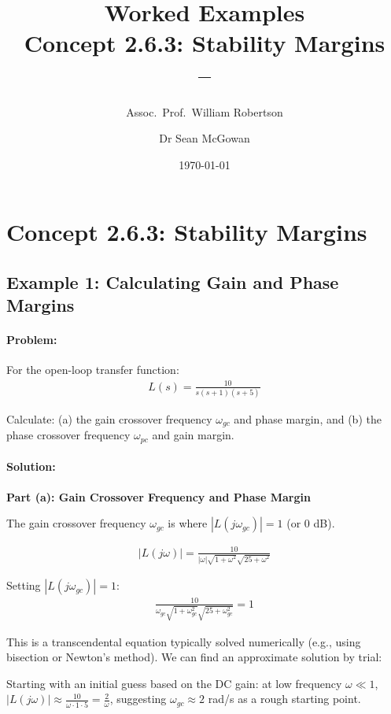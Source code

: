 \documentclass[11pt,a4paper]{article}
\title{\textbf{Worked Examples}\\[0.5em]
\large Concept 2.6.3: Stability Margins\\[0.3em]
\normalsize \coursesubtitle{} -- \coursetitle}
\author{Assoc.\ Prof.\ William Robertson \and Dr Sean McGowan}
\date{\today}
\begin{document}
\maketitle
\tableofcontents
\newpage

\section{Concept 2.6.3: Stability Margins}

\subsection{Example 1: Calculating Gain and Phase Margins}

\paragraph{Problem:} For the open-loop transfer function:
\begin{align}
  L(s) = \frac{10}{s(s+1)(s+5)}
\end{align}

Calculate: (a) the gain crossover frequency $\omega_{gc}$ and phase margin, and (b) the phase crossover frequency $\omega_{pc}$ and gain margin.

\paragraph{Solution:}

\textbf{Part (a): Gain Crossover Frequency and Phase Margin}

The gain crossover frequency $\omega_{gc}$ is where $|L(j\omega_{gc})| = 1$ (or 0 dB).

\begin{align}
  |L(j\omega)| = \frac{10}{|\omega|\sqrt{1+\omega^2}\sqrt{25+\omega^2}}
\end{align}

Setting $|L(j\omega_{gc})| = 1$:
\begin{align}
  \frac{10}{\omega_{gc}\sqrt{1+\omega_{gc}^2}\sqrt{25+\omega_{gc}^2}} = 1
\end{align}

This is a transcendental equation typically solved numerically (e.g., using bisection or Newton's method). We can find an approximate solution by trial:

Starting with an initial guess based on the DC gain: at low frequency $\omega \ll 1$, $|L(j\omega)| \approx \frac{10}{\omega \cdot 1 \cdot 5} = \frac{2}{\omega}$, suggesting $\omega_{gc} \approx 2$ rad/s as a rough starting point.
\end{document}
